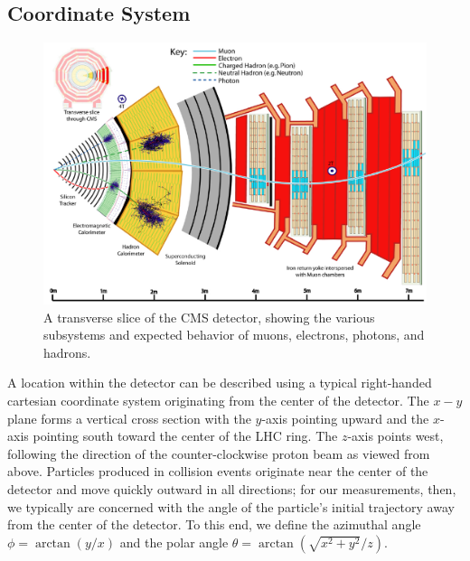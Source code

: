 \subsection{Coordinate System}


\begin{figure}
  \centering
  \includegraphics[width=\textwidth]{figures/cms-slice}
  \caption{A transverse slice of the CMS detector, showing the various subsystems and expected behavior of muons, electrons, photons, and hadrons.}
  \label{cms-xsections}
\end{figure}

A location within the \cms detector can be described using a typical right-handed cartesian coordinate system originating from the center of the detector.  The $x-y$ plane forms a vertical cross section with the $y$-axis pointing upward and the $x$-axis pointing south toward the center of the LHC ring.  The $z$-axis points west, following the direction of the counter-clockwise proton beam as viewed from above.  Particles produced in collision events originate near the center of the detector and move quickly outward in all directions; for our measurements, then, we typically are concerned with the angle of the particle's initial trajectory away from the center of the detector.  To this end, we define the azimuthal angle $\phi = \arctan(y/x)$ and the polar angle $\theta = \arctan(\sqrt{x^2 + y^2}/z)$.

